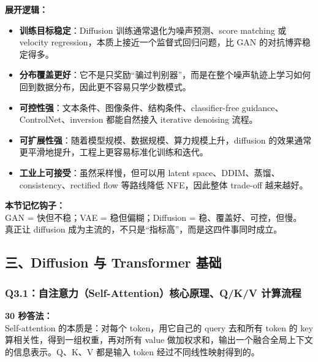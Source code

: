\textbf{展开逻辑：}
\begin{itemize}[leftmargin=1.5em]
  \item \textbf{训练目标稳定}：Diffusion 训练通常退化为噪声预测、score matching 或 velocity regression，本质上接近一个监督式回归问题，比 GAN 的对抗博弈稳定得多。
  \item \textbf{分布覆盖更好}：它不是只奖励“骗过判别器”，而是在整个噪声轨迹上学习如何回到数据分布，因此更不容易只学少数模式。
  \item \textbf{可控性强}：文本条件、图像条件、结构条件、classifier-free guidance、ControlNet、inversion 都能自然接入 iterative denoising 流程。
  \item \textbf{可扩展性强}：随着模型规模、数据规模、算力规模上升，diffusion 的效果通常更平滑地提升，工程上更容易标准化训练和迭代。
  \item \textbf{工业上可接受}：虽然采样慢，但可以用 latent space、DDIM、蒸馏、consistency、rectified flow 等路线降低 NFE，因此整体 trade-off 越来越好。
\end{itemize}

\begin{summarybox}
\textbf{本节记忆钩子：}\\
GAN = 快但不稳；VAE = 稳但偏糊；Diffusion = 稳、覆盖好、可控，但慢。\\
真正让 diffusion 成为主流的，不只是“指标高”，而是这四件事同时成立。
\end{summarybox}

\subsection{三、Diffusion 与 Transformer 基础}

\subsubsection{Q3.1：自注意力（Self-Attention）核心原理、Q/K/V 计算流程}

\begin{conceptbox}
\textbf{30 秒答法：}\\
Self-attention 的本质是：对每个 token，用它自己的 query 去和所有 token 的 key 算相关性，得到一组权重，再对所有 value 做加权求和，输出一个融合全局上下文的信息表示。Q、K、V 都是输入 token 经过不同线性映射得到的。
\end{conceptbox}

